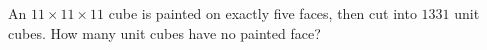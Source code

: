 An $11\times11\times11$ cube is painted on exactly five faces, then cut into $1331$ unit cubes. How many unit cubes have no painted face?
